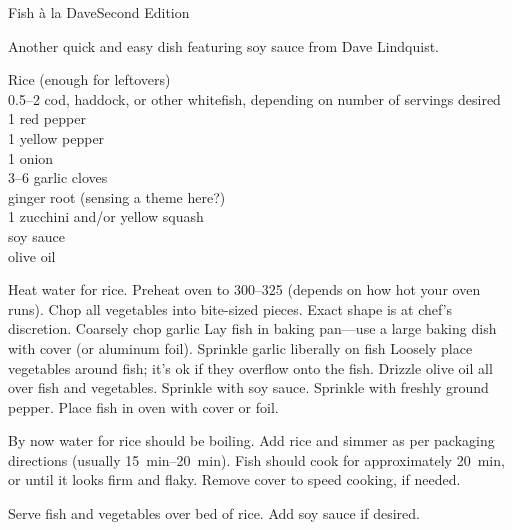 \begin{entry}{Fish \`{a} la Dave}{Second Edition}

\begin{open}
    Another quick and easy dish featuring soy sauce from Dave Lindquist.
\end{open}
\begin{ingredients}
    Rice (enough for leftovers)\\
    \SIrange{0.5}{2}{\pound} cod, haddock, or other whitefish, depending on
    number of servings desired\\
    1 red pepper\\
    1 yellow pepper\\
    1 onion\\
    \numrange{3}{6} garlic cloves\\
    ginger root (sensing a theme here?)\\
    1 zucchini and/or yellow squash\\
    soy sauce\\
    olive oil
\end{ingredients}
Heat water for rice. Preheat oven to \SIrange{300}{325}{\degreeF} (depends on
how hot your oven runs). Chop all vegetables into bite-sized pieces. Exact shape
is at chef's discretion. Coarsely chop garlic Lay fish in baking pan---use a
large baking dish with cover (or aluminum foil). Sprinkle garlic liberally on
fish Loosely place vegetables around fish; it's ok if they overflow onto the
fish. Drizzle olive oil all over fish and vegetables. Sprinkle with soy sauce.
Sprinkle with freshly ground pepper. Place fish in oven with cover or foil.

By now water for rice should be boiling. Add rice and simmer as per packaging
directions (usually \SIrange{15}{20}{\minute}). Fish should cook for
approximately \SI{20}{\minute}, or until it looks firm and flaky. Remove cover
to speed cooking, if needed.

Serve fish and vegetables over bed of rice. Add soy sauce if desired.
\end{entry}

